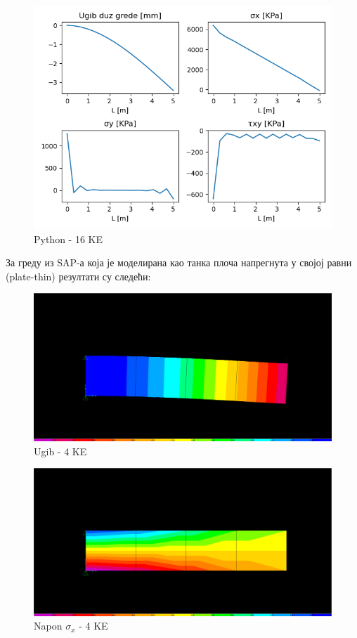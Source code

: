 \documentclass[11pt, a4paper]{article}
\begin{document}
\begin{figure}[H]
\includegraphics[width=\textwidth]{Slike/Rezultat_16KE.png}
\caption{Python - 16 KE}
\end{figure}
За греду из SAP-а  која је моделирана као танка плоча напрегнута у својој равни (plate-thin) резултати су следећи:
\begin{figure}[H]
\includegraphics[width=\textwidth]{Slike/Ugib_4KE.png}
\caption{Ugib - 4 KE}
\end{figure}
\begin{figure}[H]
\includegraphics[width=\textwidth]{Slike/Naponi_4KE.png}
\caption{Napon $\sigma_x$ - 4 KE}
\end{figure}
\end{document}

